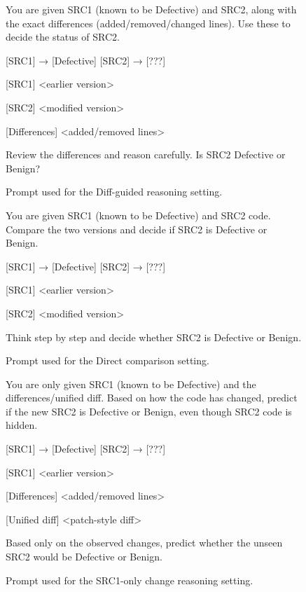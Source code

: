 \documentclass[authoryear,final,5p,times,twocolumn]{elsarticle}
\theoremstyle{plain}
\begin{document}
\begin{figure}[ht]
\centering
\begin{promptbox}
You are given SRC1 (known to be Defective) and SRC2, along with the exact differences (added/removed/changed lines). Use these to decide the status of SRC2.

[SRC1] → [Defective]
[SRC2] → [???]

[SRC1]
\textless earlier version\textgreater

[SRC2]
\textless modified version\textgreater

[Differences]
\textless added/removed lines\textgreater

Review the differences and reason carefully. Is SRC2 Defective or Benign?
\end{promptbox}
\caption{Prompt used for the Diff-guided reasoning setting.}
\label{fig:prompt_m2}
\end{figure}

\begin{figure}[ht]
\centering
\begin{promptbox}
You are given SRC1 (known to be Defective) and SRC2 code. Compare the two versions and decide if SRC2 is Defective or Benign.

[SRC1] → [Defective]
[SRC2] → [???]

[SRC1]
\textless earlier version\textgreater

[SRC2]
\textless modified version\textgreater

Think step by step and decide whether SRC2 is Defective or Benign.
\end{promptbox}
\caption{Prompt used for the Direct comparison setting.}
\label{fig:prompt_m1}
\end{figure}

\begin{figure}[ht]
\centering
\begin{promptbox}
You are only given SRC1 (known to be Defective) and the differences/unified diff. Based on how the code has changed, predict if the new SRC2 is Defective or Benign, even though SRC2 code is hidden.

[SRC1] → [Defective]
[SRC2] → [???]

[SRC1]
\textless earlier version\textgreater

[Differences]
\textless added/removed lines\textgreater

[Unified diff]
\textless patch-style diff\textgreater

Based only on the observed changes, predict whether the unseen SRC2 would be Defective or Benign.
\end{promptbox}
\caption{Prompt used for the SRC1-only change reasoning setting.}
\label{fig:prompt_m4}
\end{figure}
\end{document}
